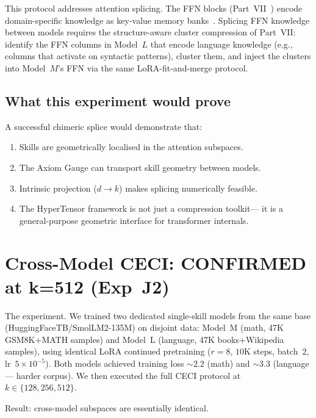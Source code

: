 \documentclass[11pt]{article}
\begin{document}
This protocol addresses attention splicing.  The FFN blocks
(Part~VII~\cite{stewart2026ffn}) encode domain-specific knowledge as
key-value memory banks~\cite{geva2021ffn}.  Splicing FFN knowledge
between models requires the structure-aware cluster compression of
Part~VII: identify the FFN columns in Model~$L$ that encode language
knowledge (e.g., columns that activate on syntactic patterns), cluster
them, and inject the clusters into Model~$M$'s FFN via the same
LoRA-fit-and-merge protocol.

\subsection{What this experiment would prove}

A successful chimeric splice would demonstrate that:
\begin{enumerate}
\item Skills are geometrically localised in the attention subspaces.
\item The Axiom Gauge can transport skill geometry between models.
\item Intrinsic projection ($d \to k$) makes splicing numerically
      feasible.
\item The HyperTensor framework is not just a compression toolkit---
      it is a general-purpose geometric interface for transformer
      internals.
\end{enumerate}

\section{Cross-Model CECI: CONFIRMED at k=512 (Exp~J2)}
\label{sec:j2-result}

The experiment.  We trained two dedicated single-skill models from
the same base (HuggingFaceTB/SmolLM2-135M) on disjoint data: Model~M (math,
47K GSM8K+MATH samples) and Model~L (language, 47K books+Wikipedia samples),
using identical LoRA continued pretraining ($r{=}8$, $10$K steps, batch~$2$,
lr~$5\times10^{-5}$).  Both models achieved training loss ${\sim}2.2$ (math)
and ${\sim}3.3$ (language — harder corpus).  We then executed the full CECI
protocol at $k\in\{128,256,512\}$.

Result: cross-model subspaces are essentially identical.
\end{document}
